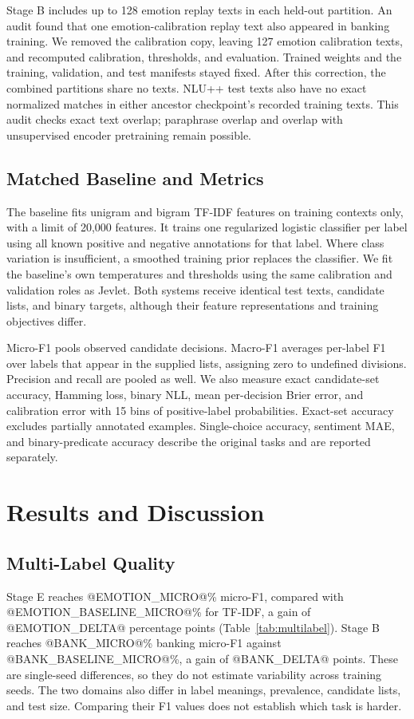 \documentclass[conference]{IEEEtran}
\begin{document}
Stage B includes up to 128 emotion replay texts in each held-out partition. An audit found that one emotion-calibration replay text also appeared in banking training. We removed the calibration copy, leaving 127 emotion calibration texts, and recomputed calibration, thresholds, and evaluation. Trained weights and the training, validation, and test manifests stayed fixed. After this correction, the combined partitions share no texts. NLU++ test texts also have no exact normalized matches in either ancestor checkpoint's recorded training texts. This audit checks exact text overlap; paraphrase overlap and overlap with unsupervised encoder pretraining remain possible.

\subsection{Matched Baseline and Metrics}
The baseline fits unigram and bigram TF-IDF features on training contexts only, with a limit of 20,000 features. It trains one regularized logistic classifier per label using all known positive and negative annotations for that label. Where class variation is insufficient, a smoothed training prior replaces the classifier. We fit the baseline's own temperatures and thresholds using the same calibration and validation roles as Jevlet. Both systems receive identical test texts, candidate lists, and binary targets, although their feature representations and training objectives differ.

Micro-F1 pools observed candidate decisions. Macro-F1 averages per-label F1 over labels that appear in the supplied lists, assigning zero to undefined divisions. Precision and recall are pooled as well. We also measure exact candidate-set accuracy, Hamming loss, binary NLL, mean per-decision Brier error, and calibration error with 15 bins of positive-label probabilities. Exact-set accuracy excludes partially annotated examples. Single-choice accuracy, sentiment MAE, and binary-predicate accuracy describe the original tasks and are reported separately.

\section{Results and Discussion}
\subsection{Multi-Label Quality}
Stage E reaches @EMOTION_MICRO@\% micro-F1, compared with @EMOTION_BASELINE_MICRO@\% for TF-IDF, a gain of @EMOTION_DELTA@ percentage points (Table~\ref{tab:multilabel}). Stage B reaches @BANK_MICRO@\% banking micro-F1 against @BANK_BASELINE_MICRO@\%, a gain of @BANK_DELTA@ points. These are single-seed differences, so they do not estimate variability across training seeds. The two domains also differ in label meanings, prevalence, candidate lists, and test size. Comparing their F1 values does not establish which task is harder.
\end{document}
